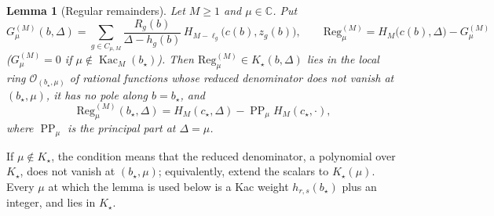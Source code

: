 \documentclass[11pt]{article}
\newtheorem{lemma}[theorem]{Lemma}
\theoremstyle{definition}
\theoremstyle{remark}
\newcommand{\PP}{\operatorname{PP}}
\newcommand{\Kac}{\operatorname{Kac}}
\begin{document}
\begin{lemma}[Regular remainders]\label{lem:reg}
Let $M\ge1$ and $\mu\in\mathbb C$.  Put
\[
 G^{(M)}_\mu(b,\Delta)=\sum_{g\in C_{\mu,M}}\frac{R_g(b)}{\Delta-h_g(b)}\,
 H_{M-\ell_g}\bigl(c(b),z_g(b)\bigr),\qquad
 \mathrm{Reg}^{(M)}_\mu=H_M\bigl(c(b),\Delta\bigr)-G^{(M)}_\mu
\]
($G^{(M)}_\mu=0$ if $\mu\notin\Kac_M(b_\star)$).  Then
$\mathrm{Reg}^{(M)}_\mu\in K_\star(b,\Delta)$ lies in the local ring
$\mathcal O_{(b_\star,\mu)}$ of rational functions whose reduced denominator does
not vanish at $(b_\star,\mu)$, it has no pole along $b=b_\star$, and
\begin{equation}\label{eq:regvalue}
 \mathrm{Reg}^{(M)}_\mu(b_\star,\Delta)
 =H_M(c_\star,\Delta)-\PP_\mu H_M(c_\star,\cdot),
\end{equation}
where $\PP_\mu$ is the principal part at $\Delta=\mu$.
\end{lemma}

If $\mu\notin K_\star$, the condition means that the reduced denominator, a
polynomial over $K_\star$, does not vanish at $(b_\star,\mu)$; equivalently,
extend the scalars to $K_\star(\mu)$.  Every $\mu$ at which the lemma is used
below is a Kac weight $h_{r,s}(b_\star)$ plus an integer, and lies in
$K_\star$.
\end{document}
